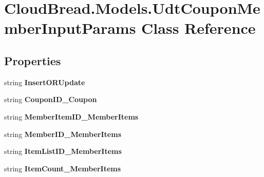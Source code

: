 \hypertarget{a00109}{}\section{Cloud\+Bread.\+Models.\+Udt\+Coupon\+Member\+Input\+Params Class Reference}
\label{a00109}
\subsection*{Properties}
\begin{DoxyCompactItemize}
\item 
string {\bfseries Insert\+O\+R\+Update}\hypertarget{a00109_a35be58473f03509b30292f062d1e587b}{}\label{a00109_a35be58473f03509b30292f062d1e587b}

\item 
string {\bfseries Coupon\+I\+D\+\_\+\+Coupon}\hypertarget{a00109_abdd208a0568617172b2c752c577efd57}{}\label{a00109_abdd208a0568617172b2c752c577efd57}

\item 
string {\bfseries Member\+Item\+I\+D\+\_\+\+Member\+Items}\hypertarget{a00109_a2cbc2db2eb35d74e13ac6b3f09bf92a1}{}\label{a00109_a2cbc2db2eb35d74e13ac6b3f09bf92a1}

\item 
string {\bfseries Member\+I\+D\+\_\+\+Member\+Items}\hypertarget{a00109_a303a464048ddaf15bcc444109e3fb6f2}{}\label{a00109_a303a464048ddaf15bcc444109e3fb6f2}

\item 
string {\bfseries Item\+List\+I\+D\+\_\+\+Member\+Items}\hypertarget{a00109_a2dcd18614bfa6a8ad6d3feaa80b823bf}{}\label{a00109_a2dcd18614bfa6a8ad6d3feaa80b823bf}

\item 
string {\bfseries Item\+Count\+\_\+\+Member\+Items}\hypertarget{a00109_ae7579604834cb8e60eadd0a50761e727}{}\label{a00109_ae7579604834cb8e60eadd0a50761e727}


\end{DoxyCompactItemize}
